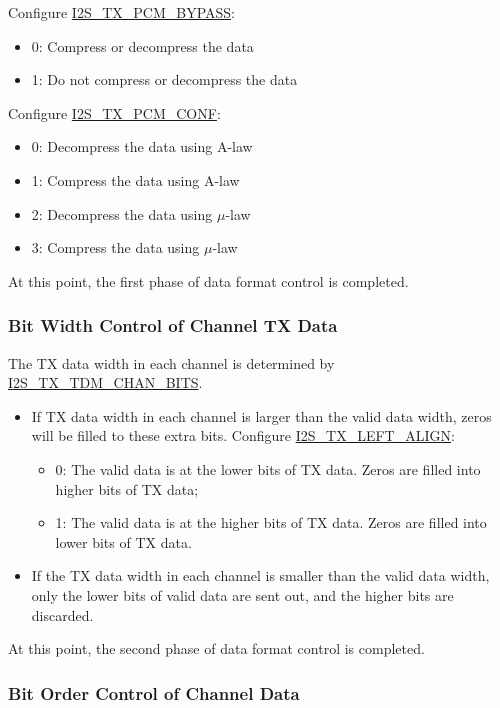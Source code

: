 \documentclass[main\_\_EN.tex]{subfiles}
\begin{document}
Configure \hyperref[fielddesc:I2STXPCMBYPASS]{I2S\_TX\_PCM\_BYPASS}:
\begin{itemize}
\item 0: Compress or decompress the data
\item 1: Do not compress or decompress the data
\end{itemize}
Configure \hyperref[fielddesc:I2STXPCMCONF]{I2S\_TX\_PCM\_CONF}: 
\begin{itemize}
\item 0: Decompress the data using A-law
\item 1: Compress the data using A-law
\item 2: Decompress the data using $\mu$-law
\item 3: Compress the data using $\mu$-law
\end{itemize}

At this point, the first phase of data format control is completed.

\subsubsection{Bit Width Control of Channel TX Data}
\label{sec:i2s-tdm-chan-bits}

The TX data width in each channel is determined by \hyperref[fielddesc:I2STXTDMCHANBITS]{I2S\_TX\_TDM\_CHAN\_BITS}.

\begin{itemize}
\item If TX data width in each channel is larger than the valid data width, zeros will be filled to these extra bits. Configure  \hyperref[fielddesc:I2STXLEFTALIGN]{I2S\_TX\_LEFT\_ALIGN}:
\begin{itemize}
\item 0: The valid data is at the lower bits of TX data. Zeros are filled into higher bits of TX data;
\item 1: The valid data is at the higher bits of TX data. Zeros are filled into lower bits of TX data.
\end{itemize}
\item If the TX data width in each channel is smaller than the valid data width, only the lower bits of valid data are sent out, and the higher bits are discarded.
\end{itemize}
At this point, the second phase of data format control is completed.

\subsubsection{Bit Order Control of Channel Data}
\end{document}
